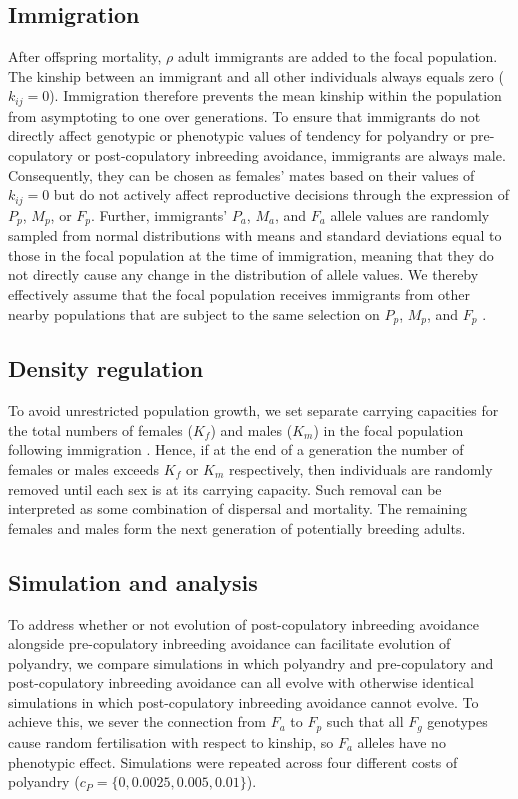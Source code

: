 \documentclass[10pt,letterpaper]{article}
\begin{document}
\subsection*{Immigration}

After offspring mortality, $\rho$ adult immigrants are added to the focal population. The kinship between an immigrant and all other individuals always equals zero ($k_{ij}=0$). Immigration therefore prevents the mean kinship within the population from asymptoting to one over generations. To ensure that immigrants do not directly affect genotypic or phenotypic values of tendency for polyandry or pre-copulatory or post-copulatory inbreeding avoidance, immigrants are always male. Consequently, they can be chosen as females' mates based on their values of $k_{ij}=0$ but do not actively affect reproductive decisions through the expression of $P_{p}$, $M_{p}$, or $F_{p}$. Further, immigrants' $P_{a}$, $M_{a}$, and $F_{a}$ allele values are randomly sampled from normal distributions with means and standard deviations equal to those in the focal population at the time of immigration, meaning that they do not directly cause any change in the distribution of allele values. We thereby effectively assume that the focal population receives immigrants from other nearby populations that are subject to the same selection on $P_{p}$, $M_{p}$, and $F_{p}$ \cite[][]{Duthie, Duthie2016a}.

\subsection*{Density regulation}

To avoid unrestricted population growth, we set separate carrying capacities for the total numbers of females ($K_{f}$) and males ($K_{m}$) in the focal population following immigration \cite[][]{Guillaume2009, Duthie}. Hence, if at the end of a generation the number of females or males exceeds $K_{f}$ or $K_{m}$  respectively, then individuals are randomly removed until each sex is at its carrying capacity. Such removal can be interpreted as some combination of dispersal and mortality. The remaining females and males form the next generation of potentially breeding adults.

\subsection*{Simulation and analysis}

To address whether or not evolution of post-copulatory inbreeding avoidance alongside pre-copulatory inbreeding avoidance can facilitate evolution of polyandry, we compare simulations in which polyandry and pre-copulatory and post-copulatory inbreeding avoidance can all evolve with otherwise identical simulations in which post-copulatory inbreeding avoidance cannot evolve. To achieve this, we sever the connection from $F_{a}$ to $F_{p}$ such that all $F_{g}$ genotypes cause random fertilisation with respect to kinship, so $F_{a}$ alleles have no phenotypic effect. Simulations were repeated across four different costs of polyandry ($c_{P} = \{0, 0.0025, 0.005,  0.01\}$).
\end{document}
